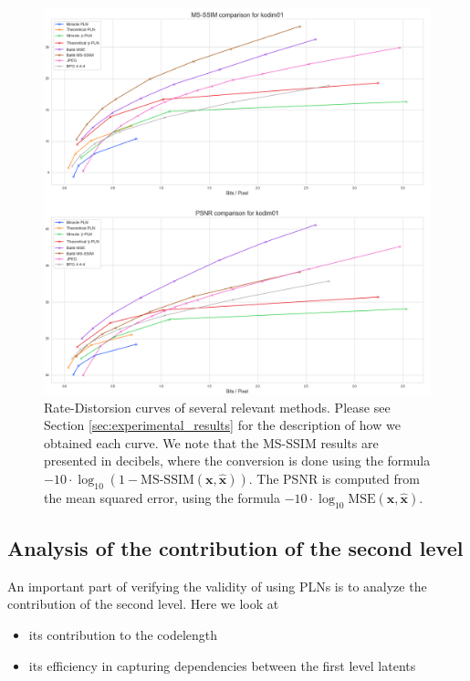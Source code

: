 \documentclass{article}
\renewcommand{\vec}[1]{\mathbf{#1}}
\begin{document}
\begin{figure}
  \centering
  \includegraphics[width=\textwidth]{../img/plots/kodak_comparison/kodim01_comparison}
  \caption{Rate-Distorsion curves of several relevant methods. Please see
    Section \ref{sec:experimental_results} for the description of how we
    obtained each curve. We note that the MS-SSIM results are presented in
    decibels, where the conversion is done using the formula $-10 \cdot
    \log_{10}\left( 1 - \text{MS-SSIM}(\vec{x}, \vec{\hat{x}}) \right)$.
    The PSNR is computed from the mean squared error, using the formula 
    $-10 \cdot \log_{10}\text{MSE}(\vec{x}, \vec{\hat{x}})$.}
  \label{fig:kodim01_comp}
\end{figure}

\subsection{Analysis of the contribution of the second level}
\par
An important part of verifying the validity of using PLNs is to analyze the
contribution of the second level. Here we look at
\begin{itemize}
\item its contribution to the codelength
\item its efficiency in capturing dependencies between the first level latents
\end{itemize}
\end{document}

